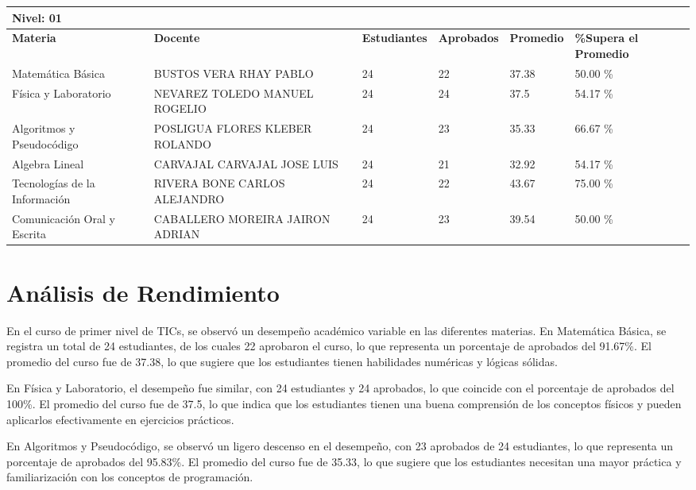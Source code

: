 \small
\begin{tabularx}{\textwidth}{|p{2.5cm}|p{2.5cm}|X|X|X|X|}
\hline
\multicolumn{6}{|X|}{\textbf{Nivel: 01 }}\\\hline\textbf{Materia} & \textbf{Docente} & \textbf{Estudiantes} & \textbf{Aprobados} & \textbf{Promedio} & \textbf{\%Supera el Promedio} \\ \hline
Matemática Básica & BUSTOS VERA RHAY PABLO & 24 & 22 & 37.38 & 50.00 \%\\ \hline
Física y Laboratorio & NEVAREZ TOLEDO MANUEL ROGELIO & 24 & 24 & 37.5 & 54.17 \%\\ \hline
Algoritmos y Pseudocódigo & POSLIGUA FLORES KLEBER ROLANDO & 24 & 23 & 35.33 & 66.67 \%\\ \hline
Algebra Lineal & CARVAJAL CARVAJAL JOSE LUIS & 24 & 21 & 32.92 & 54.17 \%\\ \hline
Tecnologías de la Información  & RIVERA BONE CARLOS ALEJANDRO & 24 & 22 & 43.67 & 75.00 \%\\ \hline
Comunicación Oral y Escrita & CABALLERO MOREIRA JAIRON ADRIAN & 24 & 23 & 39.54 & 50.00 \%\\ \hline
\end{tabularx}

\vspace{1cm}
\section{Análisis de Rendimiento}
En el curso de primer nivel de TICs, se observó un desempeño académico variable en las diferentes materias. En Matemática Básica, se registra un total de 24 estudiantes, de los cuales 22 aprobaron el curso, lo que representa un porcentaje de aprobados del 91.67\%. El promedio del curso fue de 37.38, lo que sugiere que los estudiantes tienen habilidades numéricas y lógicas sólidas.

En Física y Laboratorio, el desempeño fue similar, con 24 estudiantes y 24 aprobados, lo que coincide con el porcentaje de aprobados del 100\%. El promedio del curso fue de 37.5, lo que indica que los estudiantes tienen una buena comprensión de los conceptos físicos y pueden aplicarlos efectivamente en ejercicios prácticos.

En Algoritmos y Pseudocódigo, se observó un ligero descenso en el desempeño, con 23 aprobados de 24 estudiantes, lo que representa un porcentaje de aprobados del 95.83\%. El promedio del curso fue de 35.33, lo que sugiere que los estudiantes necesitan una mayor práctica y familiarización con los conceptos de programación.

